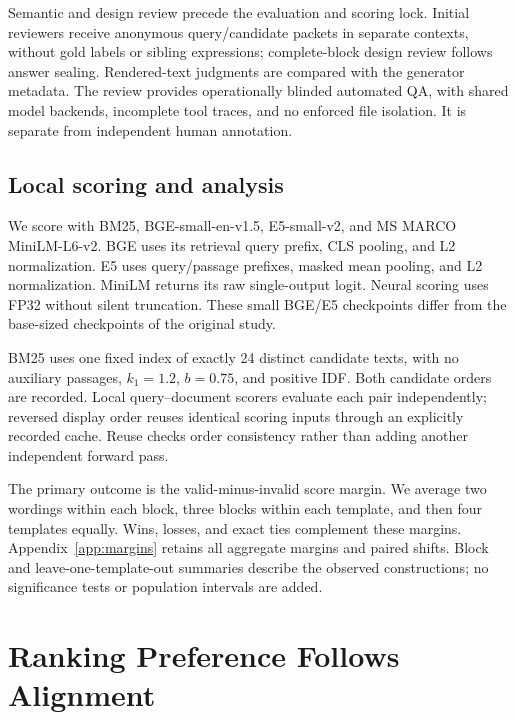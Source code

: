 \documentclass[conference,letterpaper]{IEEEtran}
\begin{document}
Semantic and design review precede the evaluation and scoring lock. Initial reviewers receive anonymous query/candidate packets in separate contexts, without gold labels or sibling expressions; complete-block design review follows answer sealing. Rendered-text judgments are compared with the generator metadata. The review provides operationally blinded automated QA, with shared model backends, incomplete tool traces, and no enforced file isolation. It is separate from independent human annotation.

\subsection{Local scoring and analysis}
We score with BM25, BGE-small-en-v1.5, E5-small-v2, and MS MARCO MiniLM-L6-v2. BGE uses its retrieval query prefix, CLS pooling, and L2 normalization. E5 uses query/passage prefixes, masked mean pooling, and L2 normalization. MiniLM returns its raw single-output logit. Neural scoring uses FP32 without silent truncation. These small BGE/E5 checkpoints differ from the base-sized checkpoints of the original study.

BM25 uses one fixed index of exactly 24 distinct candidate texts, with no auxiliary passages, $k_1=1.2$, $b=0.75$, and positive IDF. Both candidate orders are recorded. Local query--document scorers evaluate each pair independently; reversed display order reuses identical scoring inputs through an explicitly recorded cache. Reuse checks order consistency rather than adding another independent forward pass.

The primary outcome is the valid-minus-invalid score margin. We average two wordings within each block, three blocks within each template, and then four templates equally. Wins, losses, and exact ties complement these margins. Appendix~\ref{app:margins} retains all aggregate margins and paired shifts. Block and leave-one-template-out summaries describe the observed constructions; no significance tests or population intervals are added.





\section{Ranking Preference Follows Alignment}\label{sec:align-results}
\end{document}
